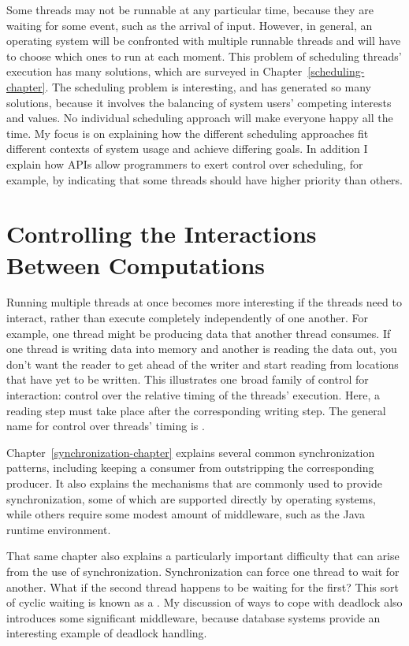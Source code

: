 Some threads may not be runnable at any particular time, because they
are waiting for some event, such as the arrival of input.  However, in
general, an operating system will be confronted with multiple runnable
threads and will have to choose which ones to run at each
moment.  This problem of scheduling threads' execution has many
solutions, which are surveyed in Chapter~\ref{scheduling-chapter}.
The scheduling problem is interesting, and has generated
so many solutions, because it involves the balancing of system
users' competing interests and values.  No individual scheduling approach
will make everyone happy all the time.  My focus is on explaining how
the different scheduling approaches fit different contexts of system
usage and achieve differing goals.  In addition I explain how APIs allow
programmers to exert control over scheduling, for example, by
indicating that some threads should have higher priority than others.

\section{Controlling the Interactions Between
  Computations}\label{controlled-interaction-section}

Running multiple threads at once becomes more interesting if the
threads need to interact, rather than execute completely
independently of one another.  For example, one thread might be
producing data that another thread consumes.  If one thread is writing
data into memory and another is reading the data out, you don't want
the reader to get ahead of the writer and start reading from locations
that have yet to be written.  This illustrates one broad family of
control for interaction: control over the relative timing of the
threads' execution.  Here, a reading step must take place after the
corresponding writing step.  The general name for control over
threads' timing is .

Chapter~\ref{synchronization-chapter} explains several common
synchronization patterns, including keeping a consumer from
outstripping the corresponding producer.  It also explains the
mechanisms that are commonly used to provide synchronization, some of
which are supported directly by operating systems, while others
require some modest amount of middleware, such as the Java runtime
environment.

That same chapter also explains a particularly important difficulty
that can arise from the use of synchronization.  Synchronization can
force one thread to wait for another.  What if the second thread
happens to be waiting for the first?  This sort of cyclic waiting is
known as a .  My discussion of ways to cope with deadlock
also introduces some significant
middleware, because database systems provide an interesting example of
deadlock handling.

